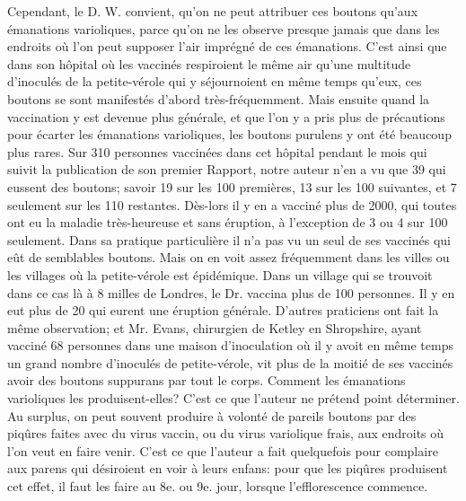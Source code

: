 Cependant, le D. W. convient, qu'on ne peut attribuer ces boutons qu'aux émanations varioliques, parce qu'on ne les observe presque jamais que dans les endroits où l'on peut supposer l'air imprégné de ces émanations. C'est ainsi que dans son hôpital où les vaccinés respiroient le même air qu'une multitude d'inoculés de la petite-vérole qui y séjournoient en même temps qu'eux, ces boutons se sont manifestés d'abord très-fréquemment. Mais ensuite quand la vaccination y est devenue plus générale, et que l'on y a pris plus de précautions pour écarter les émanations varioliques, les boutons purulens y ont été beaucoup plus rares. Sur 310 personnes\setcounter{page}{371} vaccinées dans cet hôpital pendant le mois qui suivit la publication de son premier Rapport, notre auteur n'en a vu que 39 qui eussent des boutons; savoir 19 sur les 100 premières, 13 sur les 100 suivantes, et 7 seulement sur les 110 restantes. Dès-lors il y en a vacciné plus de 2000, qui toutes ont eu la maladie très-heureuse et sans éruption, à l'exception de 3 ou 4 sur 100 seulement. Dans sa pratique particulière il n'a pas vu un seul de ses vaccinés qui eût de semblables boutons.
Mais on en voit assez fréquemment dans les villes ou les villages où la petite-vérole est épidémique. Dans un village qui se trouvoit dans ce cas là à 8 milles de Londres, le Dr. vaccina plus de 100 personnes. Il y en eut plus de 20 qui eurent une éruption générale. D'autres praticiens ont fait la même observation; et Mr. Evans, chirurgien de Ketley en Shropshire, ayant vacciné 68 personnes dans une maison d'inoculation où il y avoit en même temps un grand nombre d'inoculés de petite-vérole, vit plus de la moitié de ses vaccinés avoir des boutons suppurans par tout le corps. Comment les émanations varioliques les produisent-elles? C'est ce que l'auteur ne prétend point déterminer.
Au surplus, on peut souvent produire à\setcounter{page}{372} volonté de pareils boutons par des piqûres faites avec du virus vaccin, ou du virus variolique frais, aux endroits où l'on veut en faire venir. C'est ce que l'auteur a fait quelquefois pour complaire aux parens qui désiroient en voir à leurs enfans: pour que les piqûres produisent cet effet, il faut les faire au 8e. ou 9e. jour, lorsque l'efflorescence commence.
